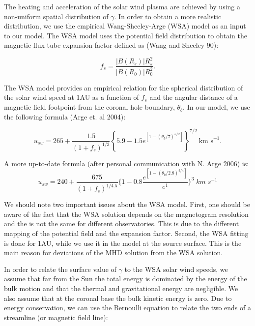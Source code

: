 The heating and acceleration of the solar wind plasma are achieved by using a 
non-uniform spatial distribution of $\gamma$. In order to obtain a more 
realistic distribution, we use the empirical Wang-Sheeley-Arge (WSA) model as 
an input to our model. The WSA model uses the potential field distribution to 
obtain the magnetic flux tube expansion factor defined as 
(Wang and Sheeley 90):

\begin{equation}
\label{expansionfactor}
f_s=\frac{|B(R_{s})|R^2_{s}}{|B(R_0)| R^2_0}.
\end{equation}

The WSA model provides an empirical relation for the spherical distribution 
of the solar wind speed at 1AU as a function of $f_s$ and the angular distance 
of a magnetic field footpoint from the coronal hole boundary, $\theta_b$. 
In our model, we use the following formula (Arge et. al 2004):

\begin{equation} 
\label{eq:WSA1}
u_{sw}  = 265 + \frac{1.5}{(1+f_s)^{1/3}} \left \{ 5.9 - 1.5 e^{\left[1 -
\left(\theta_b / 7 \right)^{5/2} \right]} \right \}^{7/2}~\mbox{km s}^{-1}.
\end{equation}

A more up-to-date formula (after personal communication with N. Arge 2006) is:
\begin{equation}
\label{eq:WSA2}
u_{sw}=240+\frac{675}{(1+f_s)^{1/4.5}}
\{ 1-0.8\frac{e^{[1-(\theta_b/2.8)^{5/4}]}}{e^1}  \}^3\;km\;s^{-1} 
\end{equation}

We should note two important issues about the WSA model. First, one should be 
aware of the fact that the WSA solution depends on the magnetogram resolution 
and the is not the same for different observatories. This is due to the 
different mapping of the potential field and the expansion factor. Second, 
the WSA fitting is done for 1AU, while we use it in the model at the source 
surface. This is the main reason for deviations of the MHD solution from the 
WSA solution. 

In order to relate the surface value of $\gamma$ to the WSA solar wind speeds, 
we assume that far from the Sun the total energy is dominated by the energy of 
the bulk motion and that the thermal and gravitational energy are negligible. 
We also assume that at the coronal base the bulk kinetic energy is zero. 
Due to energy conservation, we can use the Bernoulli equation to relate the 
two ends of a streamline (or magnetic field line):

